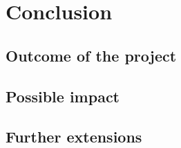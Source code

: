 \chapter{Conclusion}

\section{Outcome of the project}

\section{Possible impact}

\section{Further extensions}
